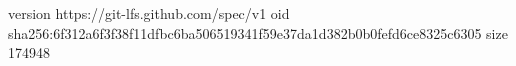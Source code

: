 version https://git-lfs.github.com/spec/v1
oid sha256:6f312a6f3f38f11dfbc6ba506519341f59e37da1d382b0b0fefd6ce8325c6305
size 174948
